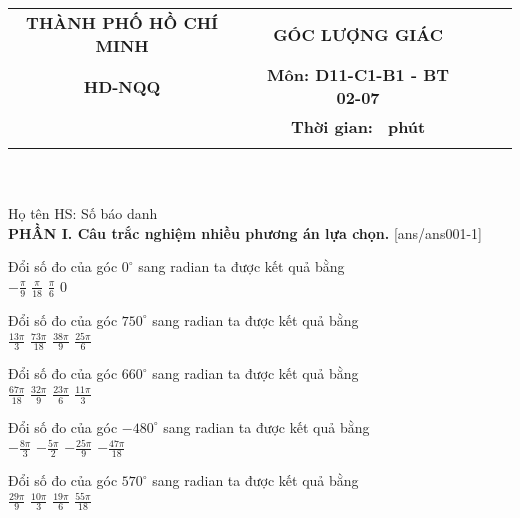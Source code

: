 \documentclass[12pt,a4paper]{article}
\newcommand{\tenso}{THÀNH PHỐ HỒ CHÍ MINH}
\newcommand{\tentruong}{HD-NQQ}
\newcommand{\tenkythi}{GÓC LƯỢNG GIÁC }
\newcommand{\tenmonthi}{Môn: D11-C1-B1 - BT 02-07}
\newcommand{\thoigian}{}
\newcommand{\tieude}[1]{
   \begin{tabular}{cm{1cm}cm{3cm}cm{4cm}}
    {\bf \tenso} & & {\bf \tenkythi} \\
    {\bf \tentruong} & & {\bf \tenmonthi}\\
    && {\bf Thời gian: \bf \thoigian \, phút}\\
    && { \fbox{\bf Mã đề: #1}}
   \end{tabular}\\\\
    
   {Họ tên HS: \dotfill Số báo danh \dotfill}\\
}
\newcommand{\chantrang}[2]{\rfoot{Trang \thepage $-$ Mã đề #2}}
\begin{document}


\tieude{001}
\setcounter{page}{1}
{\bf PHẦN I. Câu trắc nghiệm nhiều phương án lựa chọn.}
\setcounter{ex}{0}
[ans/ans001-1]
\begin{ex}
 Đổi số đo của góc $0^\circ$ sang radian ta được kết quả bằng\\ 
\choice
{ $- \frac{\pi}{9}$ }
   { $\frac{\pi}{18}$ }
     { $\frac{\pi}{6}$ }
    { \True $0$ }
\end{ex}

\begin{ex}
 Đổi số đo của góc $750^\circ$ sang radian ta được kết quả bằng\\ 
\choice
{ $\frac{13 \pi}{3}$ }
   { $\frac{73 \pi}{18}$ }
     { $\frac{38 \pi}{9}$ }
    { \True $\frac{25 \pi}{6}$ }
\end{ex}

\begin{ex}
 Đổi số đo của góc $660^\circ$ sang radian ta được kết quả bằng\\ 
\choice
{ $\frac{67 \pi}{18}$ }
   { $\frac{32 \pi}{9}$ }
     { $\frac{23 \pi}{6}$ }
    { \True $\frac{11 \pi}{3}$ }
\end{ex}

\begin{ex}
 Đổi số đo của góc $-480^\circ$ sang radian ta được kết quả bằng\\ 
\choice
{ \True $- \frac{8 \pi}{3}$ }
   { $- \frac{5 \pi}{2}$ }
     { $- \frac{25 \pi}{9}$ }
    { $- \frac{47 \pi}{18}$ }
\end{ex}

\begin{ex}
 Đổi số đo của góc $570^\circ$ sang radian ta được kết quả bằng\\ 
\choice
{ $\frac{29 \pi}{9}$ }
   { $\frac{10 \pi}{3}$ }
     { \True $\frac{19 \pi}{6}$ }
    { $\frac{55 \pi}{18}$ }
\end{ex}
\end{document}

